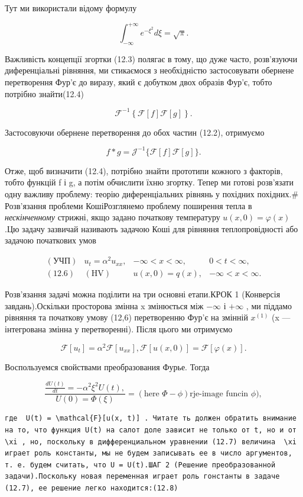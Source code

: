 \documentclass[
  ukrainian,
]{article}
\begin{document}
Тут ми використали відому формулу

\[
\int_{-\infty}^{+\infty} e^{-\xi^2} d\xi = \sqrt{\pi}.
\]

Важливість концепції згортки (12.3) полягає в тому, що дуже часто,
розв'язуючи диференціальні рівняння, ми стикаємося з необхідністю
застосовувати обернене перетворення Фур'є до виразу, який є добутком
двох образів Фур'є, тобто потрібно знайти(12.4)

\[
\mathcal{F}^{-1}\left\{\mathcal{F}\left[f\right]\mathcal{F}\left[g\right]\right\}.
\]

Застосовуючи обернене перетворення до обох частин (12.2), отримуємо

\[
f * g = \mathcal{J}^{-1} \{ \mathcal{F} [f] \mathcal{F} [g] \}.
\]

Отже, щоб визначити (12.4), потрібно знайти прототипи кожного з
факторів, тобто функцій f і g, а потім обчислити їхню згортку. Тепер ми
готові розв'язати одну важливу проблему: теорію диференціальних рівнянь
у похідних похідних.\# Розв'язання проблеми КошіРозглянемо проблему
поширення тепла в \emph{нескінченному} стрижні, якщо задано початкову
температуру \(u(x, 0) = \varphi(x)\) .Цю задачу зазвичай називають
задачою Коші для рівняння теплопровідності або задачою початкових умов

\[
\begin{array}{llll} (\text{УЧП}) & u_t = \alpha^2 u_{xx}, & -\infty < x < \infty, & 0 < t < \infty, \\ (\text{12.6}) & (\text{HV}) & u(x,0) = q(x), & -\infty < x < \infty. \end{array}
\]

Розв'язання задачі можна поділити на три основні етапи.КРОК 1 (Конверсія
завдань).Оскільки просторова змінна x змінюється між \(-\infty\) і
\(+\infty\) , ми піддамо рівняння та початкову умову (12,6) перетворенню
Фур'є на змінній \(x^{(1)}\) (x --- інтегрована змінна у перетворенні).
Після цього ми отримуємо

\[
\mathcal{F}[u_t] = \alpha^2 \mathcal{F}[u_{xx}],
\mathcal{F}[u(x, 0)] = \mathcal{F}[\varphi(x)].
\]

Воспользуемся свойствами преобразования Фурье. Тогда

\[
\frac{\frac{dU(t)}{dt} = -\alpha^2 \xi^2 U(t), }{U(0) = \Phi(\xi)} = (\text{here } \Phi - \phi) \text{rje-image funcin } \phi),
\]

\begin{verbatim}
где  U(t) = \mathcal{F}[u(x, t)] . Читате ть должен обратить внимание на то, что функция U(t) на салот доле зависит не только от t, но и от  \xi , но, поскольку в дифференциальном уравнении (12.7) величина  \xi  играет роль константы, мы не будем записывать ее в число аргументов, т. е. будем считать, что U = U(t).ШАГ 2 (Решение преобразованной задачи).Поскольку новая переменная играет роль гонстанты в задаче (12.7), ее решение легко находится:(12.8)
\end{verbatim}
\end{document}
